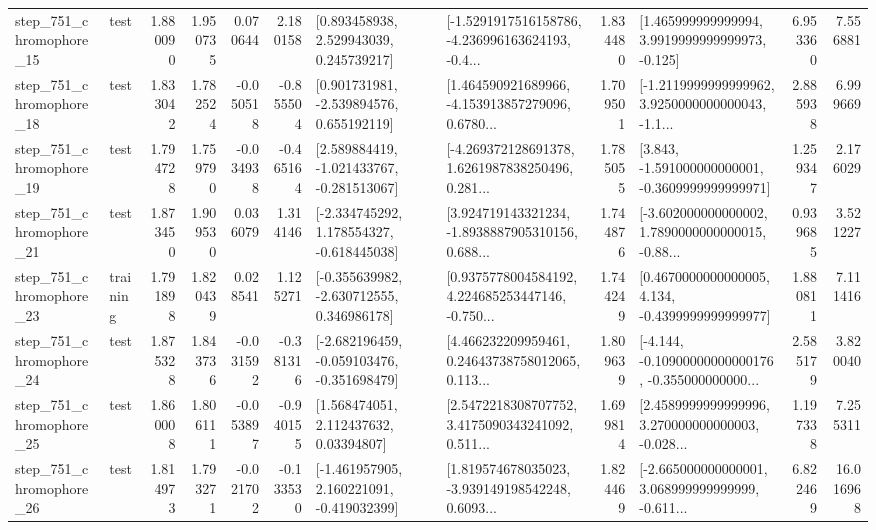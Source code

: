\begin{tabular}{llrrrrllrlrr}
  step\_751\_chromophore\_15 &      test &      1.880090 &    1.950735 &      0.070644 &  2.180158 &     [0.893458938, 2.529943039, 0.245739217] &  [-1.5291917516158786, -4.236996163624193, -0.4... &       1.834480 &    [1.465999999999994, 3.9919999999999973, -0.125] &            6.953360 &          7.556881 \\
  step\_751\_chromophore\_18 &      test &      1.833042 &    1.782524 &     -0.050518 & -0.855504 &    [0.901731981, -2.539894576, 0.655192119] &  [1.464590921689966, -4.153913857279096, 0.6780... &       1.709501 &  [-1.2119999999999962, 3.9250000000000043, -1.1... &            2.885938 &          6.999669 \\
  step\_751\_chromophore\_19 &      test &      1.794728 &    1.759790 &     -0.034938 & -0.465164 &   [2.589884419, -1.021433767, -0.281513067] &  [-4.269372128691378, 1.6261987838250496, 0.281... &       1.785055 &   [3.843, -1.591000000000001, -0.3609999999999971] &            1.259347 &          2.176029 \\
  step\_751\_chromophore\_21 &      test &      1.873450 &    1.909530 &      0.036079 &  1.314146 &   [-2.334745292, 1.178554327, -0.618445038] &  [3.924719143321234, -1.8938887905310156, 0.688... &       1.744876 &  [-3.602000000000002, 1.7890000000000015, -0.88... &            0.939685 &          3.521227 \\
  step\_751\_chromophore\_23 &  training &      1.791898 &    1.820439 &      0.028541 &  1.125271 &   [-0.355639982, -2.630712555, 0.346986178] &  [0.9375778004584192, 4.224685253447146, -0.750... &       1.744249 &   [0.4670000000000005, 4.134, -0.4399999999999977] &            1.880811 &          7.111416 \\
  step\_751\_chromophore\_24 &      test &      1.875328 &    1.843736 &     -0.031592 & -0.381316 &  [-2.682196459, -0.059103476, -0.351698479] &  [4.466232209959461, 0.24643738758012065, 0.113... &       1.809639 &  [-4.144, -0.10900000000000176, -0.355000000000... &            2.585179 &          3.820040 \\
  step\_751\_chromophore\_25 &      test &      1.860008 &    1.806111 &     -0.053897 & -0.940155 &      [1.568474051, 2.112437632, 0.03394807] &  [2.5472218308707752, 3.4175090343241092, 0.511... &       1.699814 &  [2.4589999999999996, 3.270000000000003, -0.028... &            1.197338 &          7.255311 \\
  step\_751\_chromophore\_26 &      test &      1.814973 &    1.793271 &     -0.021702 & -0.133530 &   [-1.461957905, 2.160221091, -0.419032399] &  [1.819574678035023, -3.939149198542248, 0.6093... &       1.824469 &  [-2.665000000000001, 3.068999999999999, -0.611... &            6.822469 &         16.016968 \\

\end{tabular}
